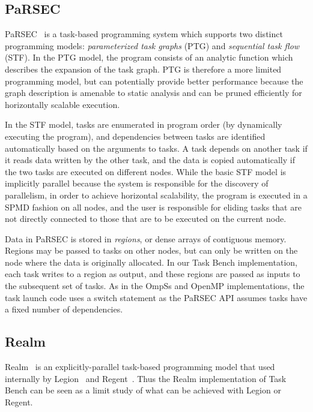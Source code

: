 
\subsection{PaRSEC}

PaRSEC~\cite{PARSEC13} is a task-based programming system which
supports two distinct programming models: \emph{parameterized task
  graphs} (PTG) and \emph{sequential task flow} (STF). In the PTG
model, the program consists of an analytic function which describes
the expansion of the task graph. PTG is therefore a more limited
programming model, but can potentially provide better performance
because the graph description is amenable to static analysis and can
be pruned efficiently for horizontally scalable execution.

In the STF model, tasks are enumerated in program order (by
dynamically executing the program), and dependencies between tasks are
identified automatically based on the arguments to tasks. A task
depends on another task if it reads data written by the other task,
and the data is copied automatically if the two tasks are executed on
different nodes. While the basic STF model is implicitly parallel
because the system is responsible for the discovery of parallelism, in
order to achieve horizontal scalability, the program is executed in a
SPMD fashion on all nodes, and the user is responsible for eliding
tasks that are not directly connected to those that are to be executed
on the current node.

Data in PaRSEC is stored in \emph{regions}, or dense arrays of
contiguous memory. Regions may be passed to tasks on other nodes, but
can only be written on the node where the data is originally
allocated. In our Task Bench implementation, each task writes to a
region as output, and these regions are passed as inputs to the
subsequent set of tasks. As in the OmpSs and OpenMP implementations,
the task launch code uses a switch statement as the PaRSEC API assumes
tasks have a fixed number of dependencies.


\subsection{Realm}

Realm~\cite{Realm14} is an explicitly-parallel task-based programming
model that used internally by Legion~\cite{Legion12} and
Regent~\cite{Regent15}. Thus the Realm implementation of Task Bench can be
seen as a limit study of what can be achieved with Legion or Regent.

